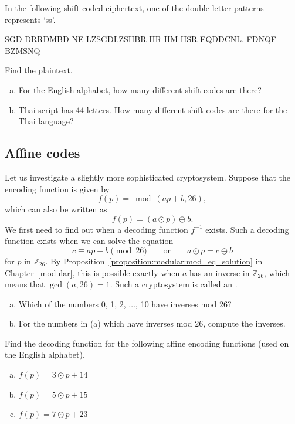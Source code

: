 \begin{exercise}{}  
In the following shift-coded ciphertext,  one of the double-letter patterns represents `ss'. 

SGD DRRDMBD NE LZSGDLZSHBR HR HM HSR EQDDCNL. FDNQF BZMSNQ

\noindent
Find the plaintext.
\end{exercise}

\begin{exercise}{}  
\begin{enumerate}[(a)]
\item
For the English alphabet, how many different shift codes are there?
\item
Thai script has 44 letters. How many different shift codes are there for the Thai language?
\end{enumerate}
\end{exercise}


\subsection{Affine codes}
 
Let us investigate a slightly more sophisticated cryptosystem. Suppose
that the encoding function is given by  
$$
f(p) = \bmod(ap + b,  26),
$$
which can also be written as
$$
f(p) = (a \odot p) \oplus b.
$$
We first need to find out when a decoding function $f^{-1}$ exists.
Such a decoding function exists when we can solve the equation
$$
c \equiv ap + b \pmod{26}\qquad \textrm{or}\qquad a \odot p = c \ominus  b
$$
for $p$ in $\mathbb{Z}_{26}$. By Proposition~\ref{proposition:modular:mod_eq_solution} in Chapter~\ref{modular}, this is possible exactly when $a$ has an
inverse in $\mathbb{Z}_{26}$, which means that $\gcd( a, 26) =1$. 
Such a cryptosystem is called an . 
 
\begin{exercise}{}
\begin{enumerate}[(a)]
\item
Which of the numbers 0, 1, 2, $\dots$, 10 have inverses mod 26?
\item
For the numbers in (a) which have inverses mod 26, compute the inverses.
\end{enumerate}
\end{exercise}


\begin{exercise}{}
Find the decoding function for the following  affine encoding functions (used on the English alphabet).
\begin{enumerate}[(a)]
\item
$f(p)=3 \odot p + 14$
\item
$f(p)=5 \odot p + 15$
\item
$f(p)=7 \odot p + 23$
\end{enumerate}
\end{exercise}

